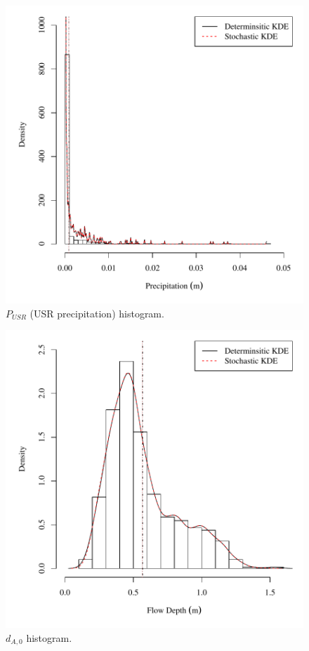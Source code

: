 \begin{center}
\begin{figure}[htbp]
	\includegraphics[width=6in]{"Figures/Results_USR/V density p"}
	\caption{$P_{USR}$ (USR precipitation) histogram.}
\end{figure}
\end{center}
\newpage

\begin{center}
\begin{figure}[htbp]
	\includegraphics[width=6in]{"Figures/Results_USR/V density depthA1"}
	\caption{$d_{A,0}$ histogram.}
\end{figure}
\end{center}
\newpage

